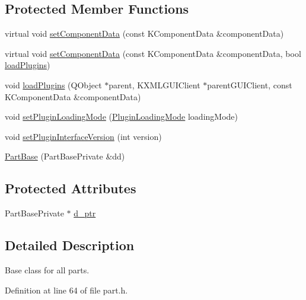 \subsection*{Protected Member Functions}
\begin{DoxyCompactItemize}
\item 
virtual void \hyperlink{classKParts_1_1PartBase_a5542df2a60d5ed1882bf31ac89d9a8fe}{set\+Component\+Data} (const K\+Component\+Data \&component\+Data)
\item 
virtual void \hyperlink{classKParts_1_1PartBase_af8ef8d076e01eda7b03fadca80b41afc}{set\+Component\+Data} (const K\+Component\+Data \&component\+Data, bool \hyperlink{classKParts_1_1PartBase_aca02ff148518a56d98a1fc8e96d7f637}{load\+Plugins})
\item 
void \hyperlink{classKParts_1_1PartBase_aca02ff148518a56d98a1fc8e96d7f637}{load\+Plugins} (Q\+Object $\ast$parent, K\+X\+M\+L\+G\+U\+I\+Client $\ast$parent\+G\+U\+I\+Client, const K\+Component\+Data \&component\+Data)
\item 
void \hyperlink{classKParts_1_1PartBase_abaf6f9e33fa1890008905f9a1356e1a1}{set\+Plugin\+Loading\+Mode} (\hyperlink{classKParts_1_1PartBase_a73b04eba759c3505ac722b2ceaaa8b76}{Plugin\+Loading\+Mode} loading\+Mode)
\item 
void \hyperlink{classKParts_1_1PartBase_a5a9ed59560edb848e787c4b3cee878b1}{set\+Plugin\+Interface\+Version} (int version)
\item 
\hyperlink{classKParts_1_1PartBase_acf7602b6a274df3a055ef39dcda3b6ed}{Part\+Base} (Part\+Base\+Private \&dd)
\end{DoxyCompactItemize}
\subsection*{Protected Attributes}
\begin{DoxyCompactItemize}
\item 
Part\+Base\+Private $\ast$ \hyperlink{classKParts_1_1PartBase_a5655e19a6338ea12c0e0a92956277e08}{d\+\_\+ptr}
\end{DoxyCompactItemize}


\subsection{Detailed Description}
Base class for all parts. 

Definition at line 64 of file part.\+h.



